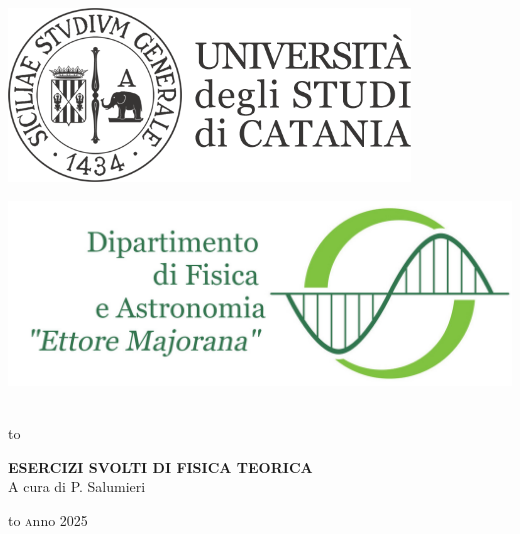 \begin{titlingpage}
    \begin{center}

\begin{minipage}[c]{0.45\textwidth}
\begin{flushleft}
\includegraphics[width=0.8\textwidth]{logo-unict-orizzontale-grigio.png}
\end{flushleft}
\end{minipage}
\hfill
\begin{minipage}[c]{0.45\textwidth}
\begin{flushright}
\includegraphics[width=\textwidth]{logo_dfa_orizzontale}
\end{flushright}
\end{minipage}\\
\medskip
\hbox to \textwidth{\hrulefill}

\vfill
\vfill

\uppercase{\textsc{ \Large{\textbf{Esercizi svolti di Fisica Teorica}}}}\\

\vfill
\large{A cura di P. Salumieri}

\vfill
\vfill
\hbox to \textwidth{\hrulefill}
{\textsc anno 2025}
\end{center}
\end{titlingpage}
\restoregeometry